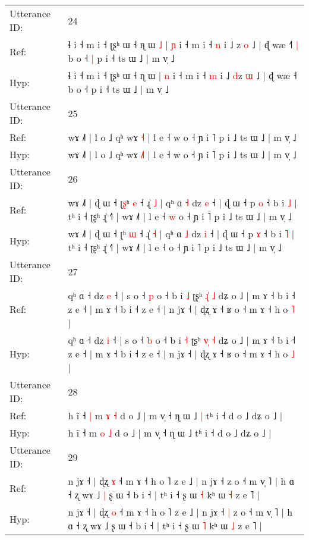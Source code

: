\documentclass[10pt]{article}
\DeclareRobustCommand{\hl}[1]{{\textcolor{red}{#1}}}
\begin{document}
\begin{longtable}{ll}
 \\
\midrule
Utterance ID: & 24 \\
Ref: & ɬ i ˧ m i ˧ ʈʂʰ ɯ ˧ ɳ ɯ\hl{ }\hl{˩} | \hl{ɲ} i ˧ m i ˧ \hl{n} i ˩ \hl{}z \hl{o} ˩ | ɖ wæ ˧\hl{˥}\hl{ }\hl{|} b o ˧\hl{ }\hl{|} p i ˧ ts ɯ ˩ | m v̩ ˩
 \\
Hyp: & ɬ i ˧ m i ˧ ʈʂʰ ɯ ˧ ɳ ɯ\hl{}\hl{} | \hl{n} i ˧ m i ˧ \hl{m} i ˩ \hl{d}z \hl{ɯ} ˩ | ɖ wæ ˧\hl{}\hl{}\hl{} b o ˧\hl{}\hl{} p i ˧ ts ɯ ˩ | m v̩ ˩
 \\
\midrule
Utterance ID: & 25 \\
Ref: & wɤ ˩˥ | l o ˩ qʰ wɤ \hl{}\hl{˧} | l e ˧ w o ˧ ɲ i ˥ p i ˩ ts ɯ ˩ | m v̩ ˩
 \\
Hyp: & wɤ ˩˥ | l o ˩ qʰ wɤ \hl{˩}\hl{˥} | l e ˧ w o ˧ ɲ i ˥ p i ˩ ts ɯ ˩ | m v̩ ˩
 \\
\midrule
Utterance ID: & 26 \\
Ref: & wɤ ˩˥ | ɖ ɯ ˧ ʈ\hl{ʂ}ʰ \hl{e} ˧ ɻ̍ \hl{˩} | qʰ ɑ \hl{˧} dz \hl{e} ˧ | ɖ ɯ ˧ p \hl{o} ˧ b i \hl{˩} | tʰ i ˧ ʈʂʰ ɻ̍ ˧˥ | wɤ ˩˥ | l e ˧\hl{ }\hl{w} o ˧ ɲ i ˥ p i ˩ ts ɯ ˩ | m v̩ ˩
 \\
Hyp: & wɤ ˩˥ | ɖ ɯ ˧ ʈ\hl{}ʰ \hl{ɯ} ˧ ɻ̍ \hl{˧} | qʰ ɑ \hl{˩} dz \hl{i} ˧ | ɖ ɯ ˧ p \hl{ɤ} ˧ b i \hl{˥} | tʰ i ˧ ʈʂʰ ɻ̍ ˧˥ | wɤ ˩˥ | l e ˧\hl{}\hl{} o ˧ ɲ i ˥ p i ˩ ts ɯ ˩ | m v̩ ˩
 \\
\midrule
Utterance ID: & 27 \\
Ref: & qʰ ɑ ˧ dz \hl{e} ˧ | s o ˧ \hl{p} o ˧ b i \hl{˩} ʈʂʰ \hl{ɻ}\hl{̍} \hl{˩} dʑ o ˩ | m ɤ ˧ b i ˧ z e ˧ | m ɤ ˧ b i ˧ z e ˧ | n jɤ ˧ | ɖʐ ɤ ˧ ʁ o ˧ m ɤ ˧ h o \hl{˥} |
 \\
Hyp: & qʰ ɑ ˧ dz \hl{i} ˧ | s o ˧ \hl{b} o ˧ b i \hl{˧} ʈʂʰ \hl{v}\hl{̩} \hl{˧} dʑ o ˩ | m ɤ ˧ b i ˧ z e ˧ | m ɤ ˧ b i ˧ z e ˧ | n jɤ ˧ | ɖʐ ɤ ˧ ʁ o ˧ m ɤ ˧ h o \hl{˩} |
 \\
\midrule
Utterance ID: & 28 \\
Ref: & h ĩ ˧\hl{ }\hl{|} m \hl{ɤ} \hl{˧} d o ˩ | m v̩ ˧ ɳ ɯ ˩\hl{ }\hl{|} tʰ i ˧ d o ˩ dʑ o ˩ |
 \\
Hyp: & h ĩ ˧\hl{}\hl{} m \hl{o} \hl{˩} d o ˩ | m v̩ ˧ ɳ ɯ ˩\hl{}\hl{} tʰ i ˧ d o ˩ dʑ o ˩ |
 \\
\midrule
Utterance ID: & 29 \\
Ref: & n jɤ ˧ | ɖʐ \hl{ɤ} ˧ m ɤ ˧ h o ˥ z e ˩ | n jɤ ˧\hl{}\hl{} z o ˧ m v̩ ˥ | h ɑ ˧ ʐ wɤ ˩\hl{ }\hl{|} ʂ ɯ ˧ b i ˧ | tʰ i ˧ ʂ ɯ \hl{˧} kʰ ɯ \hl{˧} z e ˥ |
 \\
Hyp: & n jɤ ˧ | ɖʐ \hl{o} ˧ m ɤ ˧ h o ˥ z e ˩ | n jɤ ˧\hl{ }\hl{|} z o ˧ m v̩ ˥ | h ɑ ˧ ʐ wɤ ˩\hl{}\hl{} ʂ ɯ ˧ b i ˧ | tʰ i ˧ ʂ ɯ \hl{˥} kʰ ɯ \hl{˩} z e ˥ |

\end{longtable}
\end{document}

